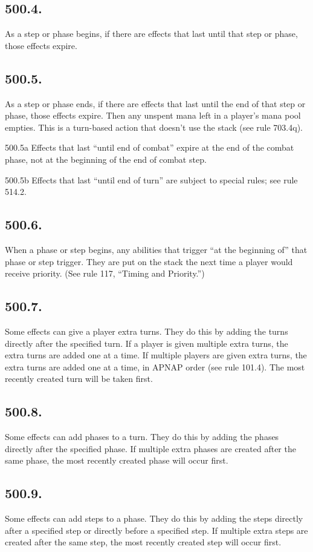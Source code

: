 \subsection*{500.4.}
As a step or phase begins, if there are effects that last until that step or phase, those effects expire.

\subsection*{500.5.}
As a step or phase ends, if there are effects that last until the end of that step or phase, those effects expire. Then any unspent mana left in a player’s mana pool empties. This is a turn-based action that doesn’t use the stack (see rule 703.4q).

500.5a Effects that last “until end of combat” expire at the end of the combat phase, not at the beginning of the end of combat step.

500.5b Effects that last “until end of turn” are subject to special rules; see rule 514.2.

\subsection*{500.6.}
When a phase or step begins, any abilities that trigger “at the beginning of” that phase or step trigger. They are put on the stack the next time a player would receive priority. (See rule 117, “Timing and Priority.”)

\subsection*{500.7.}
Some effects can give a player extra turns. They do this by adding the turns directly after the specified turn. If a player is given multiple extra turns, the extra turns are added one at a time. If multiple players are given extra turns, the extra turns are added one at a time, in APNAP order (see rule 101.4). The most recently created turn will be taken first.

\subsection*{500.8.}
Some effects can add phases to a turn. They do this by adding the phases directly after the specified phase. If multiple extra phases are created after the same phase, the most recently created phase will occur first.

\subsection*{500.9.}
Some effects can add steps to a phase. They do this by adding the steps directly after a specified step or directly before a specified step. If multiple extra steps are created after the same step, the most recently created step will occur first.

